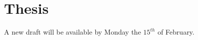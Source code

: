 
\section{Thesis}
\label{sec:thesis}

A new draft will be available by Monday the $15^{th}$ of February.



